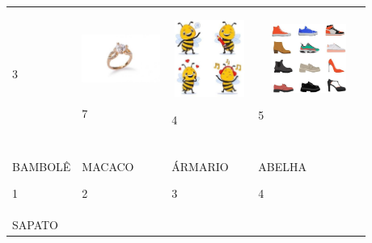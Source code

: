 \begin{longtable}[]{@{}llll@{}}
\begin{minipage}[t]{0.24\columnwidth}
3\strut
\end{minipage} & \begin{minipage}[t]{0.24\columnwidth}\raggedright\strut
\includegraphics[width=1.00972in,height=0.84375in]{media/image119.jpg}

7\strut
\end{minipage} & \begin{minipage}[t]{0.24\columnwidth}\raggedright\strut
\includegraphics[width=0.96875in,height=0.99167in]{media/image120.jpg}

4\strut
\end{minipage} & \begin{minipage}[t]{0.24\columnwidth}\raggedright\strut
\includegraphics[width=1.30694in,height=0.88542in]{media/image121.jpg}

5\strut
\end{minipage}\tabularnewline
& & &\tabularnewline
\begin{minipage}[t]{0.24\columnwidth}\raggedright\strut
BAMBOLÊ

1\strut
\end{minipage} & \begin{minipage}[t]{0.24\columnwidth}\raggedright\strut
MACACO

2\strut
\end{minipage} & \begin{minipage}[t]{0.24\columnwidth}\raggedright\strut
ÁRMARIO

3\strut
\end{minipage} & \begin{minipage}[t]{0.24\columnwidth}\raggedright\strut
ABELHA

4\strut
\end{minipage}\tabularnewline
\begin{minipage}[t]{0.24\columnwidth}\raggedright\strut
SAPATO


\end{minipage}
\end{longtable}
